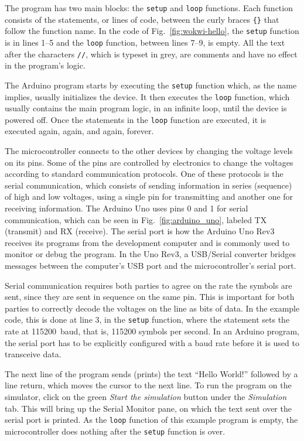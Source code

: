 The program has two main blocks: the \texttt{setup} and \texttt{loop} functions.
Each function consists of the statements, or lines of code, between the curly braces \texttt{\{\}} that follow the function name.
In the code of Fig.~\ref{fig:wokwi-hello}, the \texttt{setup} function is in lines 1--5 and the \texttt{loop} function, between lines 7--9, is empty.
All the text after the characters \texttt{//}, which is typeset in grey, are comments and have no effect in the program's logic.

The Arduino program starts by executing the \texttt{setup} function which, as the name implies, usually initializes the device.
It then executes the \texttt{loop} function, which usually contains the main program logic, in an infinite loop, until the device is powered off.
Once the statements in the \texttt{loop} function are executed, it is executed again, again, and again, forever.

The microcontroller connects to the other devices by changing the voltage levels on its pins.
Some of the pins are controlled by electronics to change the voltages according to standard communication protocols.
One of these protocols is the serial communication, which consists of sending information in series (sequence) of high and low voltages, using a single pin for transmitting and another one for receiving information.
The Arduino Uno uses pins 0 and 1 for serial communication, which can be seen in Fig.~\ref{fig:arduino_uno}, labeled TX (transmit) and RX (receive).
The serial port is how the Arduino Uno Rev3 receives its programs from the development computer and is commonly used to monitor or debug the program.
In the Uno Rev3, a USB/Serial converter bridges messages between the computer's USB port and the microcontroller's serial port.

Serial communication requires both parties to agree on the rate the symbols are sent, since they are sent in sequence on the same pin.
This is important for both parties to correctly decode the voltages on the line as bits of data.
In the example code, this is done at line 3, in the \texttt{setup} function, where the statement  sets the rate at \SI{115200}{baud}, that is, \num{115200} symbols per second.
In an Arduino program, the serial port has to be explicitly configured with a baud rate before it is used to transceive data.

The next line of the program sends (prints) the text ``Hello World!'' followed by a line return, which moves the cursor to the next line.
To run the program on the simulator, click on the green \emph{Start the simulation} button under the \emph{Simulation} tab.
This will bring up the Serial Monitor pane, on which the text sent over the serial port is printed.
As the \texttt{loop} function of this example program is empty, the microcontroller does nothing after the \texttt{setup} function is over.

